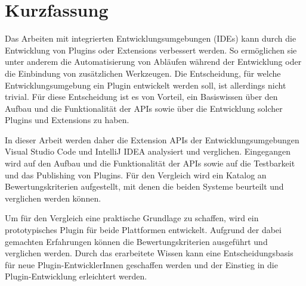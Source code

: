 \chapter*{Kurzfassung}

Das Arbeiten mit integrierten Entwicklungsumgebungen (IDEs)
kann durch die Entwicklung von 
Plugins oder Extensions verbessert werden. So ermöglichen sie unter
anderem die Automatisierung von Abläufen während der Entwicklung oder
die Einbindung von zusätzlichen Werkzeugen. Die Entscheidung,
für welche Entwicklungsumgebung ein Plugin entwickelt werden soll,
ist allerdings nicht trivial. Für diese Entscheidung ist es von Vorteil,
ein Basiswissen über den Aufbau und die Funktionalität der APIs
sowie über die Entwicklung solcher Plugins und Extensions zu haben.

In dieser Arbeit werden daher die Extension APIs der Entwicklungsumgebungen
Visual Studio Code
und IntelliJ IDEA analysiert und verglichen. Eingegangen wird
auf den Aufbau und die Funktionalität der APIs sowie 
auf die Testbarkeit und das Publishing von Plugins.
Für den Vergleich wird ein Katalog an Bewertungskriterien aufgestellt, 
mit denen die beiden Systeme beurteilt und verglichen werden können.

Um für den Vergleich eine praktische Grundlage zu schaffen, wird
ein prototypisches Plugin für beide Plattformen entwickelt. Aufgrund
der dabei gemachten Erfahrungen können die Bewertungskriterien
ausgeführt und verglichen werden. Durch das erarbeitete Wissen
kann eine Entscheidungsbasis für neue Plugin-EntwicklerInnen
geschaffen werden und der Einstieg in die Plugin-Entwicklung 
erleichtert werden.